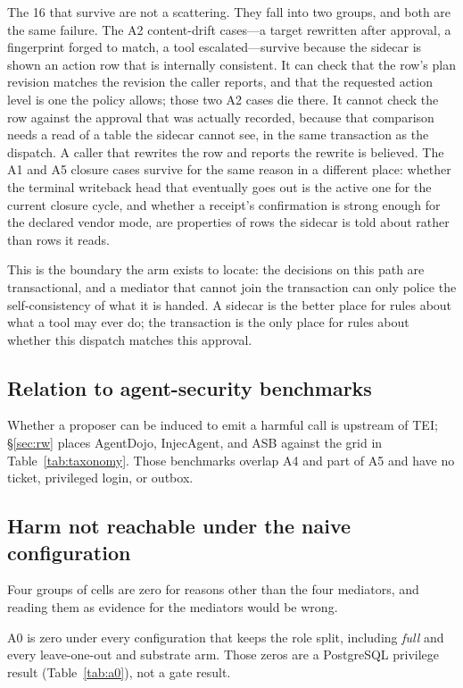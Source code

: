 \documentclass[acmsmall,manuscript,review,anonymous]{acmart}
\renewcommand{\_}{\discretionary{\textunderscore}{}{\textunderscore}}
\begin{document}
The 16 that survive are not a scattering.
They fall into two groups, and both are the same failure. The A2 content-drift
cases---a target rewritten after approval, a fingerprint forged to match, a tool
escalated---survive because the sidecar is shown an action row that is internally
consistent. It can check that the row's plan revision matches the revision the
caller reports, and that the requested action level is one the policy allows;
those two A2 cases die there. It cannot check
the row against the approval that was actually recorded, because that comparison
needs a read of a table the sidecar cannot see, in the same transaction as the
dispatch. A caller that rewrites the row and reports the rewrite is believed. The
A1 and A5 closure cases survive for the same reason in a different place: whether
the terminal writeback head that eventually goes out is the active one for the
current closure cycle, and whether a receipt's confirmation is strong enough for
the declared vendor mode, are properties of rows the sidecar is told about rather
than rows it reads.

This is the boundary the arm exists to locate: the decisions on this path
are transactional, and a mediator that cannot join the transaction can
only police the self-consistency of what it is handed. A sidecar is the
better place for rules about what a tool may ever do; the transaction is
the only place for rules about whether this dispatch matches this approval.

\subsection{Relation to agent-security benchmarks}
\label{sec:eval-coverage}

Whether a proposer can be induced to emit a harmful call is upstream of
TEI; \S\ref{sec:rw} places AgentDojo, InjecAgent, and ASB against the
grid in Table~\ref{tab:taxonomy}. Those benchmarks overlap A4 and part of
A5 and have no ticket, privileged login, or outbox.

\subsection{Harm not reachable under the naive configuration}
\label{sec:eval-falsify}

Four groups of cells are zero for reasons other than the four mediators, and
reading them as evidence for the mediators would be wrong.

A0 is zero under every configuration that keeps the role split, including
\emph{full} and every leave-one-out and substrate arm. Those zeros are a
{PostgreSQL} privilege result (Table~\ref{tab:a0}), not a gate result.
\end{document}
